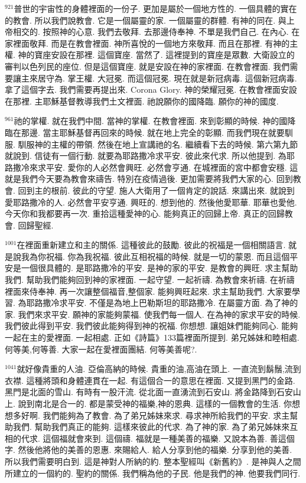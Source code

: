 \documentclass{book}
\begin{document}
$^{921}$普世的宇宙性的身體裡面的一份子.
更加是屬於一個地方性的.
一個具體的實在的教會.
所以我們說教會.
它是一個屬靈的家.
一個屬靈的群體.
有神的同在.
與上帝相交的.
按照神的心意.
我們去敬拜.
去那邊侍奉神.
不單是我們自己.
在內心.
在家裡面敬拜.
而是在教會裡面.
神所喜悅的一個地方來敬拜.
而且在那裡.
有神的主權.
神的寶座安設在那裡.
這個寶座.
當然了.
這裡提到的寶座是眾數.
大衛設立的審判以色列民的座位.
但是這個寶座.
就是安設在神的家裡面.
在教會裡面.
我們需要讓主來居守為.
掌王權.
大冠冕.
而這個冠冕.
現在就是新冠病毒.
這個新冠病毒.
拿了這個字去.
我們需要再提出來.
Corona Glory.
神的榮耀冠冕.
在教會裡面安設在那裡.
主耶穌基督教導我們土文裡面.
祂說願你的國降臨.
願你的神的國度.

$^{961}$祂的掌權.
就在我們中間.
當神的掌權.
在教會裡面.
來到彰顯的時候.
神的國降臨在那邊.
當主耶穌基督再回來的時候.
就在地上完全的彰顯.
而我們現在就要馴服.
馴服神的主權的帶領.
然後在地上宣講祂的名.
繼續看下去的時候.
第六第九節就說到.
信徒有一個行動.
就要為耶路撒冷求平安.
彼此來代求.
所以他提到.
為耶路撒冷來求平安.
愛你的人必然會興旺.
必然會亨通.
在城裡面的宮中都會安穩.
這就是我們今天要為教會來禱告.
特別在疫情過後.
更加需要將我們大家的心.
回到教會.
回到主的根前.
彼此的守望.
施人大衛用了一個肯定的說話.
來講出來.
就說到愛耶路撒冷的人.
必然會平安亨通.
興旺的.
想到他的.
然後他愛耶華.
耶華也愛他.
今天你和我都要再一次.
重拾這種愛神的心.
能夠真正的回歸上帝.
真正的回歸教會.
回歸聖經.

$^{1001}$在裡面重新建立和主的關係.
這種彼此的鼓勵.
彼此的祝福是一個相關語言.
就是說我為你祝福.
你為我祝福.
彼此互相祝福的時候.
就是一切的蒙恩.
而且這個平安是一個很具體的.
是耶路撒冷的平安.
是神的家的平安.
是教會的興旺.
求主幫助我們.
幫助我們能夠回到神的家裡面.
一起守望.
一起祈禱.
為教會來祈禱.
在祈禱裡面來侍奉神.
再一次讓整個福音,整個家.
能夠興旺起來.
求主幫助我們.
大家要學習.
為耶路撒冷求平安.
不僅是為地上巴勒斯坦的耶路撒冷.
在屬靈方面.
為了神的家.
我們來求平安.
願神的家能夠蒙福.
使我們每一個人.
在為神的家求平安的時候.
我們彼此得到平安.
我們彼此能夠得到神的祝福.
你想想.
讓姐妹們能夠同心.
能夠一起在主的愛裡面.
一起相處.
正如《詩篇》133篇裡面所提到.
弟兄姊妹和睦相處.
何等美,何等善.
大家一起在愛裡面團結.
何等美善呢?.

$^{1041}$就好像貴重的人油.
亞倫高納的時候.
貴重的油,高油在頭上.
一直流到鬍鬚,流到衣襟.
這種將頭和身體連貫在一起.
有這個合一的意思在裡面.
又提到黑門的金路.
黑門是北面的雪山.
有時有一股汗流.
從北面一直湧流到石安山.
將金路降到石安山上.
說到南北是合一的.
都是蒙受神的福樂,神的恩典.
這樣的一個教會的生活.
你想想多好啊.
我們能夠為了教會.
為了弟兄姊妹來求.
尋求神所給我們的平安.
求主幫助我們.
幫助我們真正的能夠.
這樣來彼此的代求.
為了神的家.
為了弟兄姊妹來互相的代求.
這個福就會來到.
這個禱.
福就是一種美善的福樂.
又說本為善.
善這個字.
然後他將他的美善的恩惠.
來賜給人.
給人分享到他的福樂.
分享到他的美善.
所以我們需要明白到.
這是神對人所納的約.
整本聖經叫《新舊約》.
是神與人之間所建立的一個約的.
聖約的關係.
我們稱為他的子民.
他是我們的神.
他要我們同行.
\end{document}
